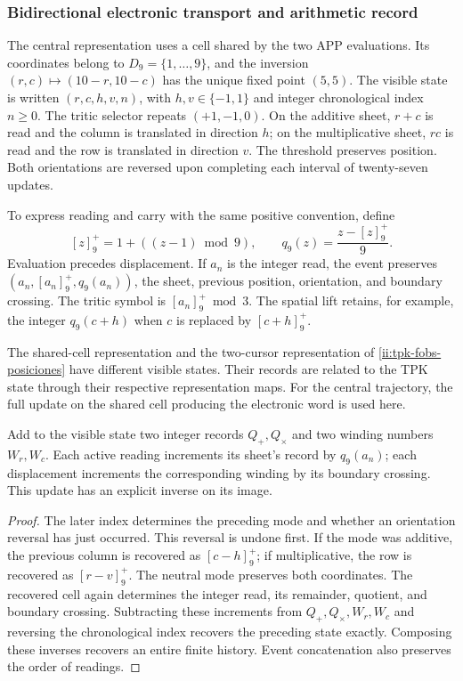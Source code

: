 \subsubsection{Bidirectional electronic transport and arithmetic record}
\label{ii:transporte-electronico}

The central representation uses a cell shared by the two
APP evaluations. Its coordinates belong to \(D_9=\{1,\ldots,9\}\),
and the inversion \((r,c)\mapsto(10-r,10-c)\) has the unique fixed point
\((5,5)\). The visible state is written \((r,c,h,v,n)\), with
\(h,v\in\{-1,1\}\) and integer chronological index \(n\geq0\).
The tritic selector repeats \((+1,-1,0)\). On the additive sheet,
\(r+c\) is read and the column is translated in direction \(h\); on the
multiplicative sheet, \(rc\) is read and the row is translated in direction
\(v\). The threshold preserves position. Both orientations are
reversed upon completing each interval of twenty-seven updates.

To express reading and carry with the same positive convention,
define
\[
 [z]^+_9=1+((z-1)\bmod9),\qquad
 q_9(z)=\frac{z-[z]^+_9}{9}.
\]
Evaluation precedes displacement. If \(a_n\) is the integer
read, the event preserves \((a_n,[a_n]^+_9,q_9(a_n))\), the sheet,
previous position, orientation, and boundary crossing. The
tritic symbol is \([a_n]^+_9\bmod3\). The spatial lift
retains, for example, the integer
\(q_9(c+h)\) when \(c\) is replaced by \([c+h]^+_9\).

The shared-cell representation and the two-cursor
representation of \eqref{ii:tpk-fobs-posiciones} have different visible
states. Their records are related to the TPK state through
their respective representation maps. For the central trajectory,
the full update on the shared cell producing the electronic word
is used here.

\begin{proposition}
\label{ii:electron-inversa-cocientes}
Add to the visible state two integer records \(Q_+,Q_\times\)
and two winding numbers \(W_r,W_c\). Each active reading
increments its sheet's record by \(q_9(a_n)\); each displacement
increments the corresponding winding by its boundary crossing.
This update has an explicit inverse on its image.
\end{proposition}
\begin{proof}
The later index determines the preceding mode and whether an orientation
reversal has just occurred. This reversal is undone first.
If the mode was additive, the previous column is recovered as
\([c-h]^+_9\); if multiplicative, the row is recovered as
\([r-v]^+_9\). The neutral mode preserves both coordinates. The
recovered cell again determines the integer read, its remainder,
quotient, and boundary crossing. Subtracting these increments from
\(Q_+,Q_\times,W_r,W_c\) and reversing the chronological index
recovers the preceding state exactly. Composing these
inverses recovers an entire finite history. Event concatenation
also preserves the order of readings.
\end{proof}

